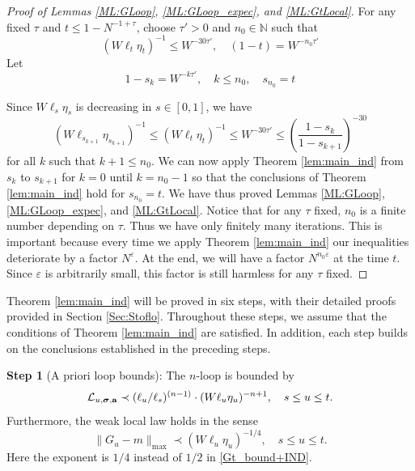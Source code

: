 \documentclass[10pt,reqno]{article}
\theoremstyle{plain} %
\theoremstyle{remark}
\numberwithin{equation}{section}
\begin{document}
\begin{proof}[Proof of Lemmas \ref{ML:GLoop}, \ref{ML:GLoop_expec},  and \ref{ML:GtLocal}]
For any fixed $\tau$ and  $t \le 1-N^{-1+\tau}$,  choose $\tau'>0$ and $n_0 \in \mathbb N$ such that 
$$
(W\ell_t\eta_t)^{-1}\le  W^{- 30 \tau'} , \quad (1-t) = W^{-n_0 \tau'}
$$
Let 
\[
1-s_{k} = W^{-k \tau'}, \quad k \le n_0, \quad s_{n_0} = t
\]
 
Since  $W\ell_s\eta_s$ is decreasing in  $s\in [0,1]$, we have 
   $$
(W\ell_{s_{k+1}}\eta_{s_{k+1}})^{-1}\le (W\ell_{t}\eta_{t})^{-1}\le W^{- 30\tau'}
\le \left(\frac{1-s_{k}}{1-s_{k+1}}\right)^{-30}
$$
for all $k$ such that  $k+1\le n_0$. 
We can now apply  Theorem  \ref{lem:main_ind} from $s_k$ to $s_{k+1}$ for $k=0$ until $k=n_0-1$ so that the conclusions of  Theorem  \ref{lem:main_ind} hold for  $s_{n_0}=t$.  We have thus proved Lemmas \ref{ML:GLoop}, \ref{ML:GLoop_expec}, and \ref{ML:GtLocal}.  Notice that for any $\tau$ fixed, $n_0$ is a finite number depending on $\tau$.  Thus we have only finitely many iterations. This is important because every time we apply  Theorem  \ref{lem:main_ind} our inequalities deteriorate by a factor 
$N^\varepsilon$. At the end, we will have a factor $N^{n_0 \varepsilon}$ at the time $t$. Since $\varepsilon$ is arbitrarily small, this factor is still harmless for any $\tau$ fixed. 
\end{proof}


 
 
Theorem \ref{lem:main_ind} will be proved in six steps, with their detailed proofs provided in Section \ref{Sec:Stoflo}. Throughout these steps, we assume that the conditions of Theorem \ref{lem:main_ind} are satisfied. In addition, each step builds on the conclusions established in the preceding steps.

\medskip 
\noindent 
\textbf{Step 1}   (A priori loop bounds): The $n$-loop is bounded by 
 \begin{equation}\label{lRB1}
   {\cal L}_{u,\boldsymbol{\sigma}, \textbf{a}}\prec (\ell_u/\ell_s)^{(n-1)}\cdot 
   (W\ell_u\eta_u)^{-n+1},\quad  s\le u\le t.
\end{equation}
Furthermore,  the  weak local law holds in the sense 
\begin{equation}\label{Gtmwc}
    \|G_u-m\|_{\max}\prec  (W\ell_u\eta_u)^{-1/4},\quad s\le u\le t .
\end{equation} 
Here the exponent  is $1/4$ instead of $1/2$  in \eqref{Gt_bound+IND}. 
 
\end{document}
